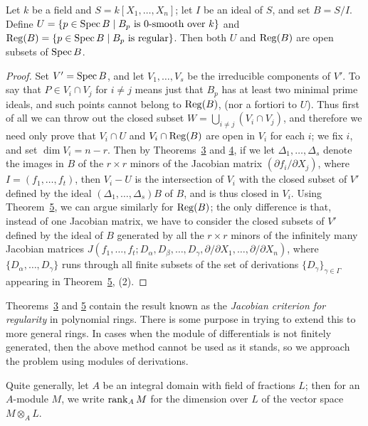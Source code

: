 \begin{corollary*}
Let $k$ be a field and $S = k[X_1, \ldots, X_n]$; let $I$ be an ideal of $S$, and set
$B = S/I$. Define $U = \{p \in \operatorname{Spec} B \mid B_p \text{ is 0-smooth over } k\}$ and
$\operatorname{Reg}(B) = \{p \in \operatorname{Spec} B \mid B_p \text{ is regular}\}$. Then both $U$ and $\operatorname{Reg}(B)$ are open
subsets of $\operatorname{Spec} B$.
\end{corollary*}

\begin{proof}
Set $V' = \operatorname{Spec} B$, and let $V_1, \ldots, V_s$ be the irreducible components of $V'$. To
say that $P \in V_i \cap V_j$ for $i \neq j$ means just that $B_p$ has at least two minimal
prime ideals, and such points cannot belong to $\operatorname{Reg}(B)$, (nor a fortiori to $U$).
Thus first of all we can throw out the closed subset $W = \bigcup_{i \neq j}(V_i \cap V_j)$,
and therefore we need only prove that $V_i \cap U$ and $V_i \cap \operatorname{Reg}(B)$ are open in
$V_i$ for each $i$; we fix $i$, and set $\dim V_i = n - r$. Then by
Theorems~\hyperref[thm:30.3]{3} and \hyperref[thm:30.4]{4}, if we let $\Delta_1, \ldots, \Delta_s$ denote the images in
$B$ of the $r \times r$ minors of the Jacobian matrix $(\partial f_i/\partial X_j)$, where
$I = (f_1, \ldots, f_t)$, then $V_i - U$ is the intersection of $V_i$ with the closed subset of
$V'$ defined by the ideal $(\Delta_1, \ldots, \Delta_s)B$ of $B$, and is thus closed in $V_i$.
Using Theorem~\hyperref[thm:30.5]{5}, we can argue similarly for $\operatorname{Reg}(B)$; the only difference
is that, instead of one Jacobian matrix, we have to consider the closed subsets
of $V'$ defined by the ideal of $B$ generated by all the $r \times r$ minors of the
infinitely many Jacobian matrices $J(f_1, \ldots, f_t; D_\alpha, D_\beta, \ldots, D_\gamma,
\partial/\partial X_1, \ldots, \partial/\partial X_n)$, where $\{D_\alpha, \ldots, D_\gamma\}$ runs through all finite
subsets of the set of derivations $\{D_\gamma\}_{\gamma \in \Gamma}$ appearing in
Theorem~\hyperref[thm:30.5]{5}, (2).
\end{proof}

Theorems~\hyperref[thm:30.3]{3} and \hyperref[thm:30.5]{5} contain the result known as the \emph{Jacobian
criterion for regularity} in polynomial rings. There is some purpose in trying to
extend this to more general rings. In cases when the module of differentials is
not finitely generated, then the above method cannot be used as it stands, so we
approach the problem using modules of derivations.

Quite generally, let $A$ be an integral domain with field of fractions $L$; then
for an $A$-module $M$, we write $\operatorname{rank}_A M$ for the dimension over $L$ of the vector
space $M \otimes_A L$.

